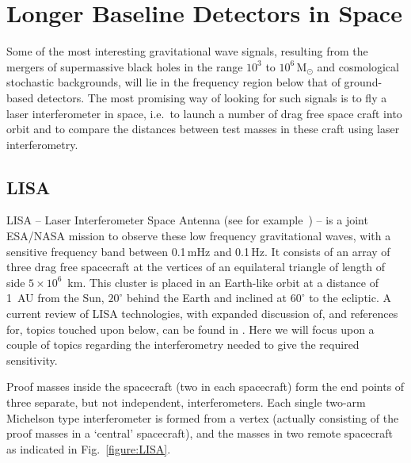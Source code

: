 \documentclass{article}
\begin{document}

\newpage

\section{Longer Baseline Detectors in Space}
\label{section:space}

Some of the most interesting gravitational wave signals, resulting from
the mergers of supermassive black holes in the range $10^3$ to 
$10^6$\,M$_{\odot}$ and cosmological stochastic backgrounds, will lie in the 
frequency region below that of ground-based detectors. The most promising way of
looking for such signals is to fly a laser interferometer in space, i.e.\ to 
launch a number of drag free space craft into orbit and to compare the distances
between test masses in these craft using laser interferometry. 

\subsection{LISA}
LISA -- Laser Interferometer Space Antenna (see for example~\cite{LISAsymposium,
NASAweb, ESAweb}) -- is a joint ESA/NASA mission to observe these low frequency 
gravitational waves, with a sensitive frequency band between 0.1\,mHz and 
0.1\,Hz. It consists of an array of three drag free spacecraft at the vertices 
of an equilateral triangle of length of side $5 \times 10^6$~km. This cluster is placed in an 
Earth-like orbit at a distance of 1~AU from the Sun, $20^{\circ}$ behind the 
Earth and inclined at $60^{\circ}$ to the ecliptic. A current review of LISA 
technologies, with expanded discussion of, and references for, topics touched 
upon below, can be found in \cite{Jennrich:2009}. Here we will focus upon a 
couple of topics regarding the interferometry needed to give the required 
sensitivity.

Proof masses inside the spacecraft (two in each spacecraft) form the end points 
of three separate, but not independent, interferometers. Each single two-arm Michelson type interferometer 
is formed from a vertex (actually consisting of the proof masses in a `central' 
spacecraft), and the masses in two remote spacecraft as indicated in 
Fig.~\ref{figure:LISA}.
\end{document}

